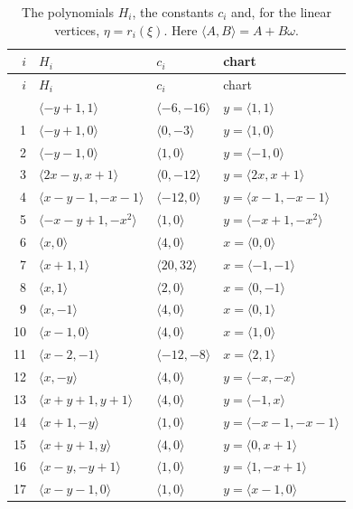 \documentclass[11pt]{article}
\begin{document}
\clearpage
\begingroup\small
\setlength{\LTcapwidth}{\textwidth}
\begin{longtable}{@{}rlll@{}}
\caption{The polynomials $H_i$, the constants $c_i$ and, for the linear vertices, $\eta=r_i(\xi)$. Here $\langle A,B\rangle=A+B\omega$.}\label{tab:vert1}\\
\hline $i$ & $H_i$ & $c_i$ & chart\\\hline\endfirsthead\hline $i$ & $H_i$ & $c_i$ & chart\\\hline\endhead\hline\endfoot
0 & $\langle -y+1,1\rangle$ & $\langle -6,-16\rangle$ & $y=\langle 1,1\rangle$\\
1 & $\langle -y+1,0\rangle$ & $\langle 0,-3\rangle$ & $y=\langle 1,0\rangle$\\
2 & $\langle -y-1,0\rangle$ & $\langle 1,0\rangle$ & $y=\langle -1,0\rangle$\\
3 & $\langle 2x-y,x+1\rangle$ & $\langle 0,-12\rangle$ & $y=\langle 2x,x+1\rangle$\\
4 & $\langle x-y-1,-x-1\rangle$ & $\langle -12,0\rangle$ & $y=\langle x-1,-x-1\rangle$\\
5 & $\langle -x-y+1,-x^{2}\rangle$ & $\langle 1,0\rangle$ & $y=\langle -x+1,-x^{2}\rangle$\\
6 & $\langle x,0\rangle$ & $\langle 4,0\rangle$ & $x=\langle 0,0\rangle$\\
7 & $\langle x+1,1\rangle$ & $\langle 20,32\rangle$ & $x=\langle -1,-1\rangle$\\
8 & $\langle x,1\rangle$ & $\langle 2,0\rangle$ & $x=\langle 0,-1\rangle$\\
9 & $\langle x,-1\rangle$ & $\langle 4,0\rangle$ & $x=\langle 0,1\rangle$\\
10 & $\langle x-1,0\rangle$ & $\langle 4,0\rangle$ & $x=\langle 1,0\rangle$\\
11 & $\langle x-2,-1\rangle$ & $\langle -12,-8\rangle$ & $x=\langle 2,1\rangle$\\
12 & $\langle x,-y\rangle$ & $\langle 4,0\rangle$ & $y=\langle -x,-x\rangle$\\
13 & $\langle x+y+1,y+1\rangle$ & $\langle 4,0\rangle$ & $y=\langle -1,x\rangle$\\
14 & $\langle x+1,-y\rangle$ & $\langle 1,0\rangle$ & $y=\langle -x-1,-x-1\rangle$\\
15 & $\langle x+y+1,y\rangle$ & $\langle 4,0\rangle$ & $y=\langle 0,x+1\rangle$\\
16 & $\langle x-y,-y+1\rangle$ & $\langle 1,0\rangle$ & $y=\langle 1,-x+1\rangle$\\
17 & $\langle x-y-1,0\rangle$ & $\langle 1,0\rangle$ & $y=\langle x-1,0\rangle$\\

\end{longtable}
\end{document}
